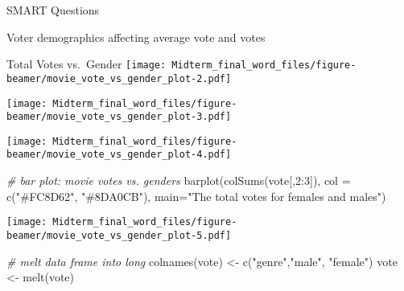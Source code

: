 \documentclass[
  ignorenonframetext,
]{beamer}
\newenvironment{Shaded}{\begin{snugshade}}{\end{snugshade}}
\newcommand{\AttributeTok}[1]{\textcolor[rgb]{0.77,0.63,0.00}{#1}}
\newcommand{\CommentTok}[1]{\textcolor[rgb]{0.56,0.35,0.01}{\textit{#1}}}
\newcommand{\DecValTok}[1]{\textcolor[rgb]{0.00,0.00,0.81}{#1}}
\newcommand{\FunctionTok}[1]{\textcolor[rgb]{0.00,0.00,0.00}{#1}}
\newcommand{\NormalTok}[1]{#1}
\newcommand{\OtherTok}[1]{\textcolor[rgb]{0.56,0.35,0.01}{#1}}
\newcommand{\SpecialCharTok}[1]{\textcolor[rgb]{0.00,0.00,0.00}{#1}}
\newcommand{\StringTok}[1]{\textcolor[rgb]{0.31,0.60,0.02}{#1}}
\begin{document}
\begin{frame}[fragile]{SMART Questions}
\begin{block}{Voter demographics affecting average vote and votes}
\begin{block}{Total Votes vs.~Gender}
\texttt{[image: Midterm\_final\_word\_files/figure-beamer/movie\_vote\_vs\_gender\_plot-2.pdf]}

\begin{Shaded}
\end{Shaded}

\texttt{[image: Midterm\_final\_word\_files/figure-beamer/movie\_vote\_vs\_gender\_plot-3.pdf]}

\begin{Shaded}
\end{Shaded}

\texttt{[image: Midterm\_final\_word\_files/figure-beamer/movie\_vote\_vs\_gender\_plot-4.pdf]}

\begin{Shaded}
\begin{Highlighting}[]
\CommentTok{\# bar plot: movie votes vs. genders}
\FunctionTok{barplot}\NormalTok{(}\FunctionTok{colSums}\NormalTok{(vote[,}\DecValTok{2}\SpecialCharTok{:}\DecValTok{3}\NormalTok{]), }\AttributeTok{col =} \FunctionTok{c}\NormalTok{(}\StringTok{"\#FC8D62"}\NormalTok{, }\StringTok{"\#8DA0CB"}\NormalTok{), }\AttributeTok{main=}\StringTok{"The total votes for females and males"}\NormalTok{)}
\end{Highlighting}
\end{Shaded}

\texttt{[image: Midterm\_final\_word\_files/figure-beamer/movie\_vote\_vs\_gender\_plot-5.pdf]}

\begin{Shaded}
\begin{Highlighting}[]
\CommentTok{\# melt data frame into long}
\FunctionTok{colnames}\NormalTok{(vote) }\OtherTok{\textless{}{-}} \FunctionTok{c}\NormalTok{(}\StringTok{"genre"}\NormalTok{,}\StringTok{"male"}\NormalTok{, }\StringTok{"female"}\NormalTok{)}
\NormalTok{vote }\OtherTok{\textless{}{-}} \FunctionTok{melt}\NormalTok{(vote)}


\end{Highlighting}
\end{Shaded}
\end{block}
\end{block}
\end{frame}
\end{document}
